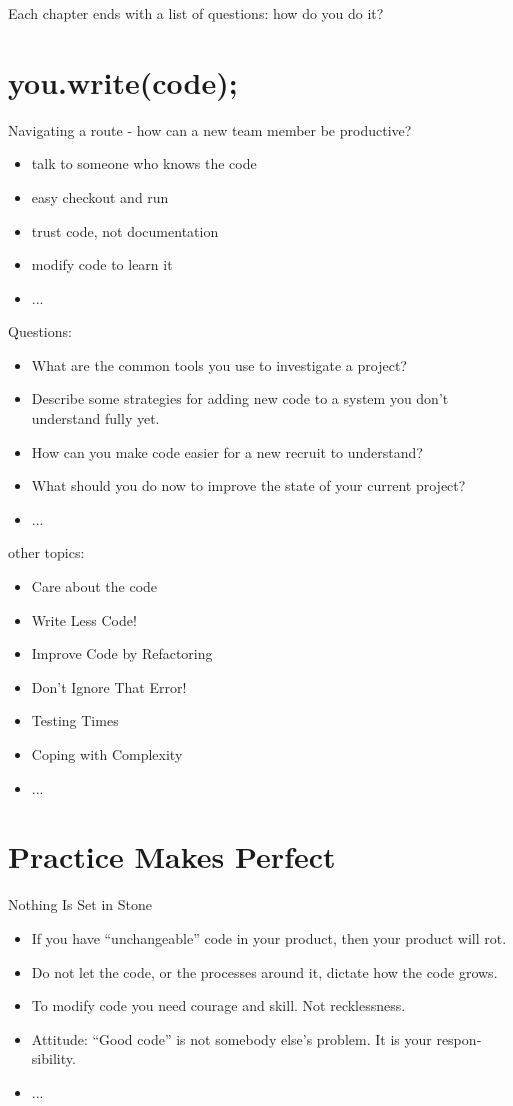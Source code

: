 \documentclass{mypresentation}
\begin{document}
\bigskip
Each chapter ends with a list of questions: how do you do it?
\newpage


\section{you.write(code);}
Navigating a route - how can a new team member be productive?
\begin{itemize}
\item talk to someone who knows the code
\item easy checkout and run
\item trust code, not documentation
\item modify code to learn it
\item ...
\end{itemize}
\newpage


Questions:
\begin{itemize}
\item What are the common tools you use to investigate a project?
\item Describe some strategies for adding new code to a system you don't understand fully yet.
\item How can you make code easier for a new recruit to understand? 
\item What should you do now to improve the state of your current project?
\item ...
\end{itemize}
\newpage


other topics:
\begin{itemize}
\item Care about the code
\item Write Less Code!
\item Improve Code by Refactoring
\item Don't Ignore That Error!
\item Testing Times
\item Coping with Complexity
\item ...
\end{itemize}
\newpage


\section{Practice Makes Perfect}
Nothing Is Set in Stone
\begin{itemize}
\item If you have “unchangeable” code in your product, then your product will rot.
\item Do not let the code, or the processes around it, dictate how the code grows.
\item To modify code you need courage and skill. Not recklessness.
\item Attitude: “Good code” is not somebody else’s problem. It is your respon‐ sibility.
\item ...
\end{itemize}
\newpage
\end{document}
